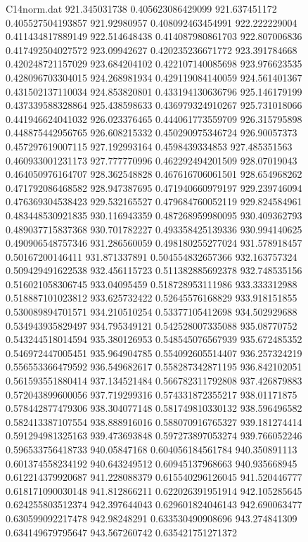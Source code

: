 \begin{filecontents}{C14norm.dat}
921.345031738			0.405623086429099
921.637451172			0.405527504193857
921.92980957			0.408092463454991
922.222229004			0.411434817889149
922.514648438			0.414087980861703
922.807006836			0.417492504027572
923.09942627			0.420235236671772
923.391784668			0.420248721157029
923.684204102			0.422107140085698
923.976623535			0.428096703304015
924.268981934			0.429119084140059
924.561401367			0.431502137110034
924.853820801			0.433194130636796
925.146179199			0.437339588328864
925.438598633			0.436979324910267
925.731018066			0.441946624041032
926.023376465			0.444061773559709
926.315795898			0.448875442956765
926.608215332			0.450290975346724
926.90057373			0.457297619007115
927.192993164			0.4598439334853
927.485351563			0.460933001231173
927.777770996			0.462292494201509
928.07019043			0.464050976164707
928.362548828			0.467616706061501
928.654968262			0.471792086468582
928.947387695			0.471940660979197
929.239746094			0.476369304538423
929.532165527			0.479684760052119
929.824584961			0.483448530921835
930.116943359			0.487268959980095
930.409362793			0.489037715837368
930.701782227			0.493358425139336
930.994140625			0.490906548757346
931.286560059			0.498180255277024
931.578918457			0.50167200146411
931.871337891			0.504554832657366
932.163757324			0.509429491622538
932.456115723			0.511382885692378
932.748535156			0.516021058306745
933.04095459			0.518728953111986
933.333312988			0.518887101023812
933.625732422			0.52645576168829
933.918151855			0.530089894701571
934.210510254			0.53377105412698
934.502929688			0.534943935829497
934.795349121			0.542528007335088
935.08770752			0.543244518014594
935.380126953			0.548545076567939
935.672485352			0.546972447005451
935.964904785			0.554092605514407
936.257324219			0.556553366479592
936.549682617			0.558287342871195
936.842102051			0.561593551880414
937.134521484			0.566782311792808
937.426879883			0.572043899600056
937.719299316			0.574331872355217
938.01171875			0.578442877479306
938.304077148			0.581749810330132
938.596496582			0.582413387107554
938.888916016			0.588070916765327
939.181274414			0.591294981325163
939.473693848			0.597273897053274
939.766052246			0.596533756418733
940.05847168			0.604056184561784
940.350891113			0.601374558234192
940.643249512			0.60945137968663
940.935668945			0.612214379920687
941.228088379			0.615540296126045
941.520446777			0.618171090030148
941.812866211			0.622026391951914
942.105285645			0.624255803512374
942.397644043			0.629601824046143
942.690063477			0.630599092217478
942.98248291			0.633530490908696
943.274841309			0.634149679795647
943.567260742			0.635421751271372

\end{filecontents}
